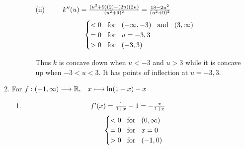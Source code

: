 \documentclass[12pt]{amsart}
\begin{document}
\begin{enumerate}
\begin{enumerate}
\begin{enumerate}
					\item[(ii)] $\text{ } \hspace{0.65cm} k''(u) = \frac{(u^2+9)(2)-(2u)(2u)}{(u^2+9)^2} = 						\frac{18-2u^2}{(u^2+9)^2}$
																											\begin{align}
							\begin{cases}
								< 0 \hspace{0.3cm} \text{for} \hspace{0.3cm} (-\infty,-3) 
								\hspace{0.3cm} \text{and} \hspace{0.3cm} (3,\infty) \notag\notag \\
								= 0 \hspace{0.3cm} \text{for} \hspace{0.3cm} u=-3,3\notag \\
								> 0 \hspace{0.3cm} \text{for} \hspace{0.3cm} (-3,3) \notag
							\end{cases}
						\end{align} 
						
					Thus $k$ is concave down when $u<-3$ and $u>3$ while it is concave up when 
					$-3<u<3$.	 It has points of inflection at $u=-3,3$. \\
			
				\end{enumerate}

		\end{enumerate}
		
	\item For $f: (-1, \infty) \longrightarrow \mathbb{R}, \hspace{0.3cm} x \longmapsto \ln(1+x)-x$ 
		
		\begin{enumerate}
		
			\item $\text{ } \hspace{3.25cm} f'(x) = \frac{1}{1+x}-1= -\frac{x}{1+x}$
						\begin{align}
							\begin{cases}
								< 0 \hspace{0.3cm} \text{for} \hspace{0.3cm} (0,\infty) \notag \\
								= 0 \hspace{0.3cm} \text{for} \hspace{0.3cm} x = 0 \notag \\
								> 0 \hspace{0.3cm} \text{for} \hspace{0.3cm} (-1, 0) \notag
							\end{cases}
						\end{align} 
			

\end{enumerate}
\end{enumerate}
\end{document}
